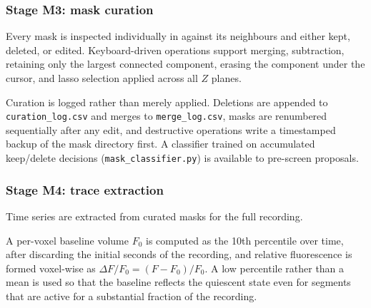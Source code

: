 		\subsubsection{Stage M3: mask curation}

			Every mask is inspected individually in \napari{} against its
			neighbours and either kept, deleted, or edited.
			Keyboard-driven operations support merging, subtraction, retaining
			only the largest connected component, erasing the component under
			the cursor, and lasso selection applied across all $Z$ planes.

			Curation is logged rather than merely applied.
			Deletions are appended to \texttt{curation\_log.csv} and merges to
			\texttt{merge\_log.csv}, masks are renumbered sequentially after any
			edit, and destructive operations write a timestamped backup of the
			mask directory first.
			A classifier trained on accumulated keep/delete decisions
			(\texttt{mask\_classifier.py}) is available to pre-screen proposals.


		\subsubsection{Stage M4: trace extraction}

			Time series are extracted from curated masks for the full recording.

			A per-voxel baseline volume $F_0$ is computed as the 10th percentile
			over time, after discarding the initial seconds of the recording, and
			relative fluorescence is formed voxel-wise as
			$\Delta F/F_0 = (F - F_0)/F_0$.
			A low percentile rather than a mean is used so that the baseline
			reflects the quiescent state even for segments that are active for a
			substantial fraction of the recording.

